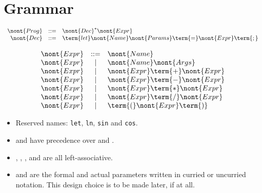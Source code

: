 \section{Grammar}

\label{section:grammar}

\[\begin{array}{rclr}
\nont{Prog}   &::=& \nont{Dec}^* \nont{Expr} \\
\nont{Dec}    &::=& \term{let} \nont{Name} \nont{Params}
                    \term{=} \nont{Expr} \term{;} \\
\end{array}\]

\[\begin{array}{rclr}
\nont{Expr}   &::=& \nont{Name} \\
\nont{Expr}   & | & \nont{Name} \nont{Args} \\
\nont{Expr}   & | & \nont{Expr} \term{+} \nont{Expr} \\
\nont{Expr}   & | & \nont{Expr} \term{-} \nont{Expr} \\
\nont{Expr}   & | & \nont{Expr} \term{*} \nont{Expr} \\
\nont{Expr}   & | & \nont{Expr} \term{/} \nont{Expr} \\
\nont{Expr}   & | & \term{(} \nont{Expr} \term{)} \\
\end{array}\]

\begin{itemize}

\item Reserved names: \texttt{let}, \texttt{ln}, \texttt{sin} and
\texttt{cos}.

\item \term{*} and \term{/} have precedence over \term{+} and \term{-}.

\item \term{+}, \term{-}, \term{*}, and \term{/} are all left-associative.

\item {} and  are the formal and actual parameters
written in curried or uncurried notation. This design choice is to be made
later, if at all.

\end{itemize}
